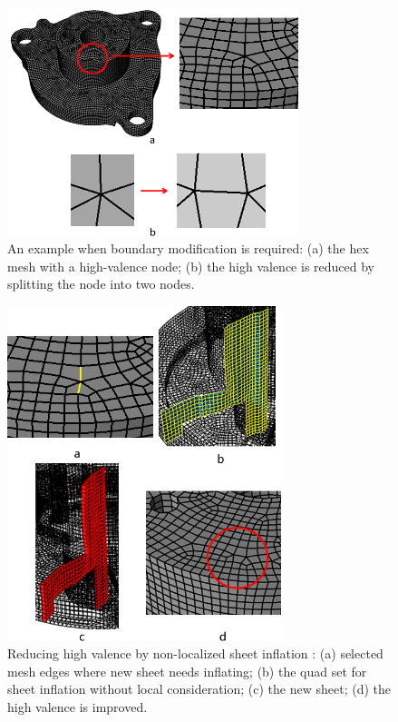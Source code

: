 \documentclass[final,5p,times,twocolumn]{elsarticle}
\begin{document}
\begin{figure}[htbp]
\begin{center}
\includegraphics[width=8.5cm]{rev_figures/intro_high_val.png}
\caption{An example when boundary modification is required: (a) the hex mesh with a high-valence node; (b) the high valence is reduced by splitting the node into two nodes.}
\label{fig:intro_high_val}
\end{center}
\end{figure}

\begin{figure}[htbp]
\begin{center}
\includegraphics[width=8cm]{rev_figures/intro_high_val_whole.png}
\caption{Reducing high valence by non-localized sheet inflation : (a) selected mesh edges where new sheet needs inflating; (b) the quad set for sheet inflation without local consideration; (c) the new sheet; (d) the high valence is improved.}
\label{fig:intro_high_val_whole}
\end{center}
\end{figure}
\end{document}
